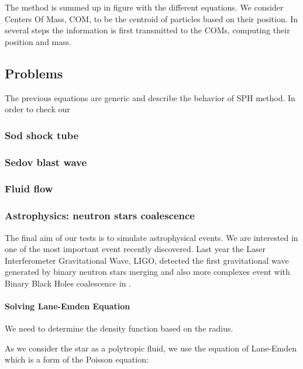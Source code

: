  \begin{figure}
 \end{figure}

The method is summed up in figure with the different equations.
We consider Centers Of Mass, COM, to be the centroid of particles based on their position. 
In several steps the information is first transmitted to the COMs, computing their position and mass. 


\subsection{Problems} 
The previous equations are generic and describe the behavior of SPH method. 
In order to check our 

\subsubsection{Sod shock tube}

\subsubsection{Sedov blast wave}

\subsubsection{Fluid flow}

\subsubsection{Astrophysics: neutron stars coalescence}

The final aim of our tests is to simulate astrophysical events. 
We are interested in one of the most important event recently discovered. 
Last year the Laser Interferometer Gravitational Wave, LIGO, detected the first gravitational wave generated by binary neutron stars merging \cite{abbott2017gw170817} and also more complexes event with Binary Black Holes coalescence in \cite{abbott2017gw170814}.


\paragraph{Solving Lane-Emden Equation}

We need to determine the density function based on the radius. 

As we consider the star as a polytropic fluid, we use the equation of Lane-Emden which is a form of the Poisson equation: 

